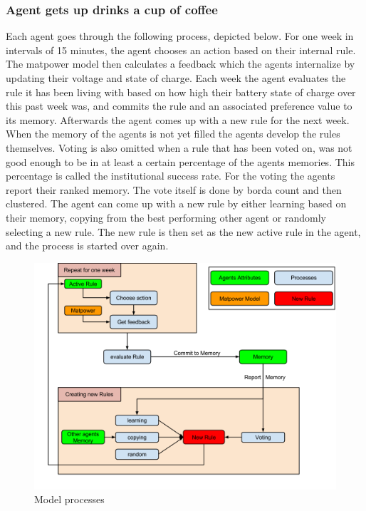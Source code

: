 \documentclass[a4paper]{article}
\begin{document}
\subsubsection{Agent gets up drinks a cup of coffee}
Each agent goes through the following process, depicted below. For one week in intervals of 15 minutes, the agent 
chooses an action based on their internal rule. The matpower model then calculates a feedback which the agents internalize
by updating their voltage and state of charge. Each week the agent evaluates the rule it has been living with based on how 
high their battery state of charge over this past week was, and commits the rule and an associated preference value to 
its memory. Afterwards the agent comes up with a new rule for the next week. When the memory of the agents is not yet 
filled the agents develop the rules themselves. Voting is also omitted when a rule that has been voted on, was not good 
enough to be in at least a certain percentage of the agents memories. This percentage is called the institutional success 
rate. For the voting the agents report their ranked memory. The vote itself is done by borda count and then clustered.  
The agent can come up with a new rule by either learning based on their memory, copying from the best performing other 
agent or randomly selecting a new rule. The new rule is then set as the new active rule in the agent, and the process is
started over again.
\begin{figure}[!ht]
\includegraphics[width =\textwidth]{concept_coffe.png}
\caption{Model processes}
\label{model_coffee}
\end{figure}
\end{document}
